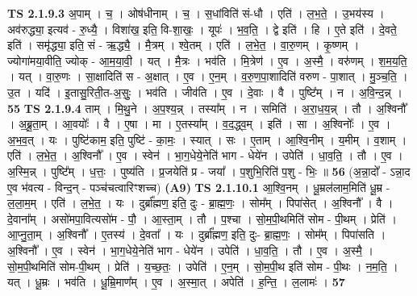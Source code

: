 \documentclass[17pt]{extarticle}
\begin{document}
                  \newline
                                \textbf{ TS 2.1.9.3} \newline
                  अ॒पाम् । च॒ । ओष॑धीनाम् । च॒ । स॒धांविति॑ सं-धौ । एति॑ । ल॒भ॒ते॒ । उ॒भय॑स्य । अव॑रुद्ध्या॒ इत्यव॑ - रु॒ध्यै॒ । विशा॑ख॒ इति॒ वि-शा॒खः॒ । यूपः॑ । भ॒व॒ति॒ । द्वे इति॑ । हि । ए॒ते इति॑ । दे॒वते॒ इति॑ । समृ॑द्ध्या॒ इति॒ सं - ऋ॒द्ध्यै॒ । मै॒त्रम् । श्वे॒तम् । एति॑ । ल॒भे॒त॒ । वा॒रु॒णम् । कृ॒ष्णम् । ज्योगा॑मया॒वीति॒ ज्योक् - आ॒म॒या॒वी॒ । यत् । मै॒त्रः । भव॑ति । मि॒त्रेण॑ । ए॒व । अ॒स्मै॒ । वरु॑णम् । श॒म॒य॒ति॒ । यत् । वा॒रु॒णः । सा॒क्षादिति॑ स - अ॒क्षात् । ए॒व । ए॒न॒म् । व॒रु॒ण॒पा॒शादिति॑ वरुण - पा॒शात् । मु॒ञ्च॒ति॒ । उ॒त । यदि॑ । इ॒तासु॒रिती॒त-अ॒सुः॒ । भव॑ति । जीव॑ति । ए॒व । दे॒वाः । वै । पुष्टि᳚म् । न । अ॒वि॒न्द॒न्न् । \textbf{  55} \newline
                  \newline
                                \textbf{ TS 2.1.9.4} \newline
                  ताम् । मि॒थु॒ने । अ॒प॒श्य॒न्न् । तस्या᳚म् । न । समिति॑ । अ॒रा॒ध॒य॒न्न् । तौ । अ॒श्विनौ᳚ । अ॒ब्रू॒ता॒म् । आ॒वयोः᳚ । वै । ए॒षा । मा । ए॒तस्या᳚म् । व॒द॒द्ध्व॒म् । इति॑ । सा । अ॒श्विनोः᳚ । ए॒व । अ॒भ॒व॒त् । यः । पुष्टि॑काम॒ इति॒ पुष्टि॑ - का॒मः॒ । स्यात् । सः । ए॒ताम् । आ॒श्वि॒नीम् । य॒मीम् । व॒शाम् । एति॑ । ल॒भे॒त॒ । अ॒श्विनौ᳚ । ए॒व । स्वेन॑ । भा॒ग॒धेये॒नेति॑ भाग - धेये॑न । उपेति॑ । धा॒व॒ति॒ । तौ । ए॒व । अ॒स्मि॒न्न् । पुष्टि᳚म् । ध॒त्तः॒ । पुष्य॑ति । प्र॒जयेति॑ प्र - जया᳚ । प॒शुभि॒रिति॑ प॒शु - भिः॒ ॥ \textbf{  56} \newline
                  \newline
                      (अ॒न्ना॒दो᳚ - ऽन्ना॒द ए॒व भ॑वत्य - विन्द॒न् - पञ्च॑चत्वारिꣳशच्च)  \textbf{(A9)} \newline \newline
                                \textbf{ TS 2.1.10.1} \newline
                  आ॒श्वि॒नम् । धू॒म्रल॑लाम॒मिति॑ धू॒म्र - ल॒ला॒म॒म् । एति॑ । ल॒भे॒त॒ । यः । दुर्ब्रा᳚ह्मण॒ इति॒ दुः - ब्रा॒ह्म॒णः॒ । सोम᳚म् । पिपा॑सेत् । अ॒श्विनौ᳚ । वै । दे॒वाना᳚म् । असो॑मपा॒वित्यसो॑म - पौ॒ । आ॒स्ता॒म् । तौ । प॒श्चा । सो॒म॒पी॒थमिति॑ सोम - पी॒थम् । प्रेति॑ । आ॒प्नु॒ता॒म् । अ॒श्विनौ᳚ । ए॒तस्य॑ । दे॒वता᳚ । यः । दुर्ब्रा᳚ह्मण॒ इति॒ दुः- ब्रा॒ह्म॒णः॒ । सोम᳚म् । पिपा॑सति । अ॒श्विनौ᳚ । ए॒व । स्वेन॑ । भा॒ग॒धेये॒नेति॑ भाग - धेये॑न । उपेति॑ । धा॒व॒ति॒ । तौ । ए॒व । अ॒स्मै॒ । सो॒म॒पी॒थमिति॑ सोम-पी॒थम् । प्रेति॑ । य॒च्छ॒तः॒ । उपेति॑ । ए॒न॒म् । सो॒म॒पी॒थ इति॑ सोम - पी॒थः । न॒म॒ति॒ । यत् । धू॒म्रः । भव॑ति । धू॒म्रि॒माण᳚म् । ए॒व । अ॒स्मा॒त् । अपेति॑ । ह॒न्ति॒ । ल॒लामः॑ । \textbf{  57} \newline
\end{document}
